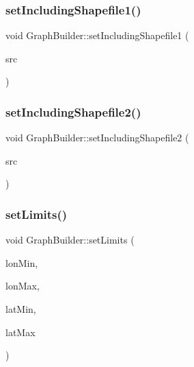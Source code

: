 \mbox{\label{class_graph_builder_a6636a000453573bf0766b61ac4ab125f}} 
\subsubsection{\texorpdfstring{setIncludingShapefile1()}{setIncludingShapefile1()}}
{\footnotesize\ttfamily void Graph\+Builder\+::set\+Including\+Shapefile1 (\begin{DoxyParamCaption}\item[{std\+::shared\+\_\+ptr$<$ G\+D\+A\+L\+Dataset $>$}]{src }\end{DoxyParamCaption})}

\mbox{\label{class_graph_builder_a422365e22c97d9c30bab2323b9ef3a3f}} 
\subsubsection{\texorpdfstring{setIncludingShapefile2()}{setIncludingShapefile2()}}
{\footnotesize\ttfamily void Graph\+Builder\+::set\+Including\+Shapefile2 (\begin{DoxyParamCaption}\item[{std\+::shared\+\_\+ptr$<$ G\+D\+A\+L\+Dataset $>$}]{src }\end{DoxyParamCaption})}

\mbox{\label{class_graph_builder_a2cf6d3a1f623f8a1d6e6bf9aa805db83}} 
\subsubsection{\texorpdfstring{setLimits()}{setLimits()}}
{\footnotesize\ttfamily void Graph\+Builder\+::set\+Limits (\begin{DoxyParamCaption}\item[{double}]{lon\+Min,  }\item[{double}]{lon\+Max,  }\item[{double}]{lat\+Min,  }\item[{double}]{lat\+Max }\end{DoxyParamCaption})}

